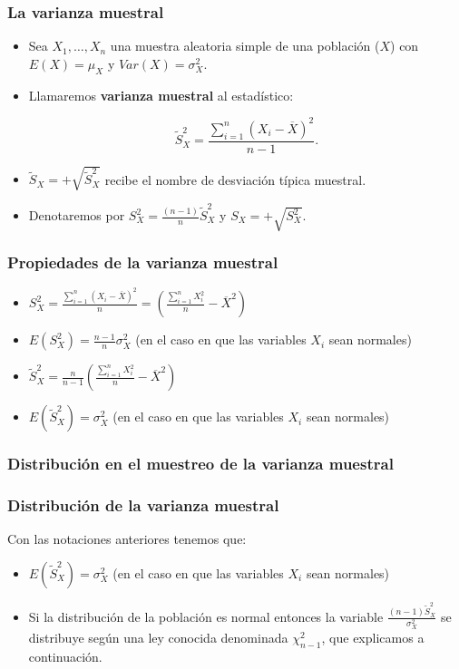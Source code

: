 \begin{frame}
\frametitle{La varianza muestral}

\begin{itemize}
\item Sea $X_{1},\ldots, X_{n}$ una muestra aleatoria simple de una población ($X$) con
$E(X)=\mu_{X}$ y $Var(X)=\sigma_{X}^2$. 
\item Llamaremos \textbf{varianza muestral} al estadístico:

$$\tilde{S}_{X}^2=\frac{\sum_{i=1}^n (X_{i}-\overline{X})^2}{n-1}.$$
\item 
$\tilde{S}_{X}=+\sqrt{\tilde{S}_{X}^2}$ recibe el nombre de desviación típica muestral.
\item 
Denotaremos por $S^2_{X}=\frac{(n-1)}{n}\tilde{S}^2_{X}$ y $S_X=+\sqrt{S_X^2}$.
\end{itemize}
\end{frame}

\begin{frame}
  \frametitle{Propiedades de la varianza muestral}
  \begin{itemize}
\item $S^2_X=\frac{\sum_{i=1}^n (X_{i}-\overline{X})^2}{n}=\left(\frac{\sum_{i=1}^n
X_{i}^2}{n}-\overline{X}^2\right)$
\item $E(S^2_X)=\frac{n-1}{n} \sigma^2_X$ (en el caso en que las variables $X_i$ sean normales)
\item $\tilde{S}_{X}^2=\frac{n}{n-1}\left(\frac{\sum_{i=1}^n
X_{i}^2}{n}-\overline{X}^2\right)$
\item $E(\tilde{S}_{X}^2)=\sigma_{X}^2$ (en el caso en que las variables $X_i$ sean normales)
\end{itemize}
\end{frame}

\subsubsection{Distribución en el muestreo de la varianza muestral}
    

\begin{frame}
\frametitle{Distribución de la varianza muestral}    
Con las notaciones anteriores tenemos que:

    \begin{itemize}
        \item $E(\tilde{S}_{X}^2)=\sigma_{X}^2$ (en el caso en que las variables $X_i$ sean normales)
        \item Si la distribución de la población es normal entonces
        la variable $\frac{(n-1)\tilde{S}_{X}^2}{\sigma_{X}^2}$ se distribuye
        según una ley conocida denominada $\chi_{n-1}^2$, que explicamos a continuación.
        \end{itemize}
\end{frame}

